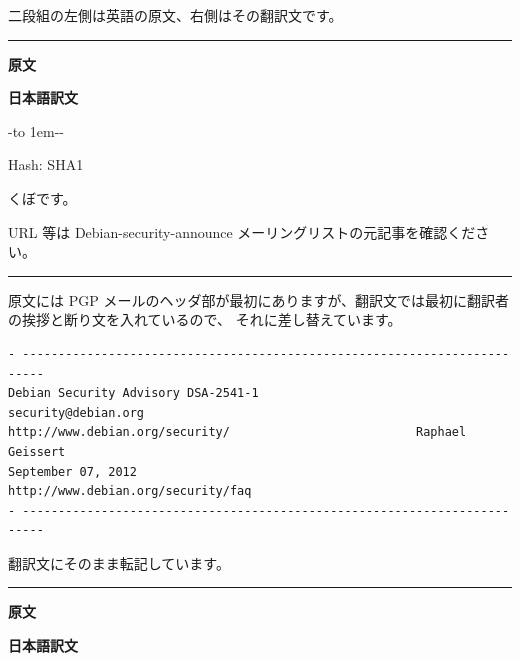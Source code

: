 \documentclass[mingoth,a4paper]{jsarticle}
\begin{document}

二段組の左側は英語の原文、右側はその翻訳文です。
\vspace{1ex}
\pagebreak[2]

\par

\hrule
\parbox[t]{0.48\linewidth}{{\bf 原文}}\hfil \parbox{0.48\linewidth}{\bf 日本語訳文}\par
-\leaders\hbox to 1em{\hss{}-\hss}\hfill -\par
\vspace{0.4em}
\parbox[t]{0.48\linewidth}{
Hash: SHA1\par\vfil
}\hfil
\parbox{0.48\linewidth}{
くぼです。\par
URL 等は Debian-security-announce メーリングリストの元記事を確認ください。\par
}
\hrule\par\vspace{1ex}

原文には PGP メールのヘッダ部が最初にありますが、翻訳文では最初に翻訳者の挨拶と断り文を入れているので、
それに差し替えています。

\vspace{1ex}

\pagebreak[2]

\par
\begin{verbatim}
- -------------------------------------------------------------------------
Debian Security Advisory DSA-2541-1                   security@debian.org
http://www.debian.org/security/                          Raphael Geissert
September 07, 2012                     http://www.debian.org/security/faq
- -------------------------------------------------------------------------
\end{verbatim}

翻訳文にそのまま転記しています。\par
\vspace*{1ex}
\pagebreak[2]
\clearpage

\hrule
{}\par
\parbox[t]{0.48\linewidth}{{\bf 原文}}\hfil \parbox{0.48\linewidth}{\bf 日本語訳文}\par\vspace{0.1em}
\end{document}
